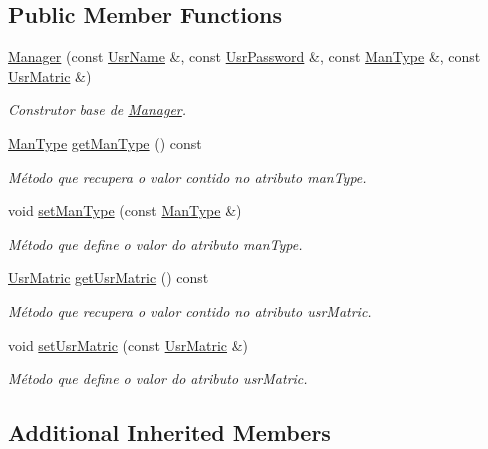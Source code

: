 \subsection*{Public Member Functions}
\begin{DoxyCompactItemize}
\item 
\hyperlink{classManager_ad2ee8089f5e80bc03fabcf9a493d045b}{Manager} (const \hyperlink{classUsrName}{Usr\-Name} \&, const \hyperlink{classUsrPassword}{Usr\-Password} \&, const \hyperlink{classUsrType}{Man\-Type} \&, const \hyperlink{classUsrMatric}{Usr\-Matric} \&)
\begin{DoxyCompactList}\small\item\em Construtor base de \hyperlink{classManager}{Manager}. \end{DoxyCompactList}\item 
\hyperlink{classUsrType}{Man\-Type} \hyperlink{classManager_a255ac6a7e2112631001296fa8db3811b}{get\-Man\-Type} () const 
\begin{DoxyCompactList}\small\item\em Método que recupera o valor contido no atributo man\-Type. \end{DoxyCompactList}\item 
void \hyperlink{classManager_a3d4e9cb6cc0e8d9be47fcc086b4e584e}{set\-Man\-Type} (const \hyperlink{classUsrType}{Man\-Type} \&)
\begin{DoxyCompactList}\small\item\em Método que define o valor do atributo man\-Type. \end{DoxyCompactList}\item 
\hyperlink{classUsrMatric}{Usr\-Matric} \hyperlink{classManager_a462f3704b016b57e087db417df73f07a}{get\-Usr\-Matric} () const 
\begin{DoxyCompactList}\small\item\em Método que recupera o valor contido no atributo usr\-Matric. \end{DoxyCompactList}\item 
void \hyperlink{classManager_a93309a0dde84dd0b5fe90d9e1da49822}{set\-Usr\-Matric} (const \hyperlink{classUsrMatric}{Usr\-Matric} \&)
\begin{DoxyCompactList}\small\item\em Método que define o valor do atributo usr\-Matric. \end{DoxyCompactList}\end{DoxyCompactItemize}
\subsection*{Additional Inherited Members}


